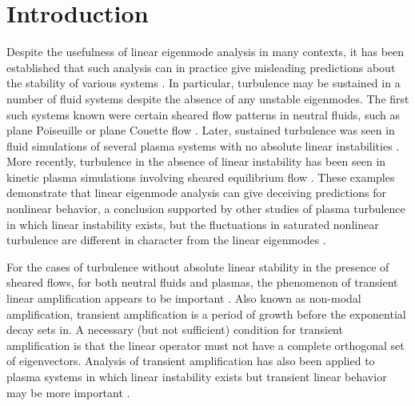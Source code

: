 \documentclass[12pt,superscriptaddress]{revtex4}
\begin{document}
\pacs{}%

\maketitle %


\section{Introduction}

Despite the usefulness of linear eigenmode analysis in many contexts,
it has been established that
such analysis can in practice give misleading predictions
about the stability of various systems \cite{TrefethenEmbree}.
In particular, turbulence may be sustained in a number of fluid systems
despite the absence of any unstable eigenmodes.
The first such systems known were certain sheared flow patterns in
neutral fluids, such as plane Poiseuille or plane Couette flow
\cite{Tillmark,TrefethenSubcritical,Grossman}.
Later, sustained turbulence was seen
in fluid simulations of several plasma systems with no absolute linear instabilities
\cite{Waltz, Scott1, Scott2, Drake}.
More recently,
turbulence in the absence of linear instability has been seen in kinetic plasma simulations involving
sheared equilibrium flow \cite{EdmundPRL, BarnesRotation}.
These examples demonstrate that linear eigenmode analysis can give
deceiving predictions for nonlinear behavior,
a conclusion supported by other studies of plasma turbulence in which
linear instability exists, but
the fluctuations in saturated nonlinear turbulence are different in character from the linear
eigenmodes \cite{Biskamp,Friedman1,Friedman2}.

For the cases of turbulence without absolute linear stability in the presence of sheared flows,
for both neutral fluids and plasmas, the phenomenon of transient linear amplification
appears to be important
\cite{TrefethenSubcritical, FarrellIoannou, Grossman, DelSoleSurvey, TrefethenEmbree, Schmid, Newton, Alex}.
Also known as non-modal amplification, transient amplification is a period of growth before
the exponential decay sets in.
A necessary (but not sufficient) condition for transient amplification
is that the linear operator must not have a complete orthogonal set of eigenvectors.
Analysis of transient amplification has also been applied to plasma systems in which
linear instability exists but transient linear behavior may be
more important \cite{Camargo, Camporeale2010, Friedman2, SquirePRL, SquireApJ}.
\end{document}
